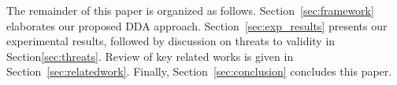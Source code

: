 

The remainder of this paper is organized as follows. Section~\ref{sec:framework} elaborates our proposed DDA approach. Section~\ref{sec:exp_results} presents our experimental results, followed by discussion on threats to validity in Section\ref{sec:threats}. Review of key related works is given in Section~\ref{sec:relatedwork}. Finally, Section~\ref{sec:conclusion} concludes this paper.


